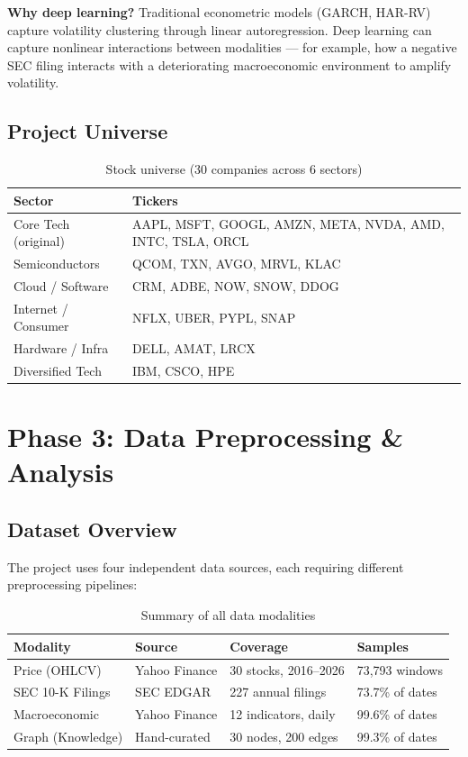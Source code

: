 \documentclass[12pt,a4paper]{article}
\begin{document}
\textbf{Why deep learning?} Traditional econometric models (GARCH, HAR-RV) capture volatility clustering through linear autoregression. Deep learning can capture nonlinear interactions between modalities --- for example, how a negative SEC filing interacts with a deteriorating macroeconomic environment to amplify volatility.

\subsection{Project Universe}

\begin{table}[H]
\centering
\caption{Stock universe (30 companies across 6 sectors)}
\begin{tabular}{ll}
\toprule
\textbf{Sector} & \textbf{Tickers} \\
\midrule
Core Tech (original)    & AAPL, MSFT, GOOGL, AMZN, META, NVDA, AMD, INTC, TSLA, ORCL \\
Semiconductors          & QCOM, TXN, AVGO, MRVL, KLAC \\
Cloud / Software        & CRM, ADBE, NOW, SNOW, DDOG \\
Internet / Consumer     & NFLX, UBER, PYPL, SNAP \\
Hardware / Infra        & DELL, AMAT, LRCX \\
Diversified Tech        & IBM, CSCO, HPE \\
\bottomrule
\end{tabular}
\end{table}

\section{Phase 3: Data Preprocessing \& Analysis}

\subsection{Dataset Overview}

The project uses four independent data sources, each requiring different preprocessing pipelines:

\begin{table}[H]
\centering
\caption{Summary of all data modalities}
\begin{tabular}{llll}
\toprule
\textbf{Modality} & \textbf{Source} & \textbf{Coverage} & \textbf{Samples} \\
\midrule
Price (OHLCV)       & Yahoo Finance    & 30 stocks, 2016--2026 & 73,793 windows \\
SEC 10-K Filings    & SEC EDGAR        & 227 annual filings    & 73.7\% of dates \\
Macroeconomic       & Yahoo Finance    & 12 indicators, daily  & 99.6\% of dates \\
Graph (Knowledge)   & Hand-curated     & 30 nodes, 200 edges   & 99.3\% of dates \\
\bottomrule
\end{tabular}
\end{table}
\end{document}
